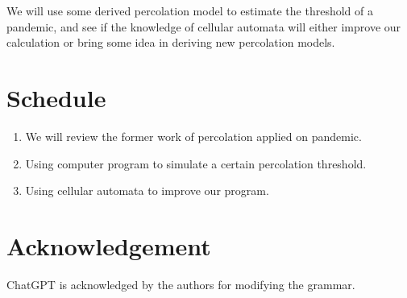 \documentclass{article}
\begin{document}
We will use some derived percolation model to estimate the threshold of a pandemic, and see if the knowledge of cellular automata will either improve our calculation or bring some idea in deriving new percolation models.
\section{Schedule}

\begin{enumerate}[(1)]
    \item We will review the former work of percolation applied on pandemic.
    \item Using computer program to simulate a certain percolation threshold.
    \item Using cellular automata to improve our program.
\end{enumerate}
\section{Acknowledgement}
ChatGPT is acknowledged by the authors for modifying the grammar.



\end{document}
